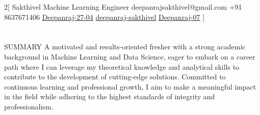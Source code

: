 \documentclass{my_cv}
\begin{document}
\begin{multicols}{2}[
        {Sakthivel}%
        {Machine Learning Engineer}%
        {deepanrajsakthivel@gmail.com}%
        {+91 8637671406}%
        {\href{https://github.com/Deepanraj-27-04}{Deepanraj-27-04}}%
        {\href{https://www.linkedin.com/in/deepanraj-sakthivel-756969224/}{deepanraj-sakthivel}}%
        {\href{https://leetcode.com/Deepanraj_07/}{Deepanraj-07}}
]
\end{multicols}




\section{\faFileText}{SUMMARY}
A motivated and results-oriented fresher with a strong academic background in Machine Learning and Data Science, eager to embark on a career path where I can leverage my theoretical knowledge and analytical skills to contribute to the development of cutting-edge solutions. Committed to continuous learning and professional growth, I aim to make a meaningful impact in the field while adhering to the highest standards of integrity and professionalism.
\end{document}
